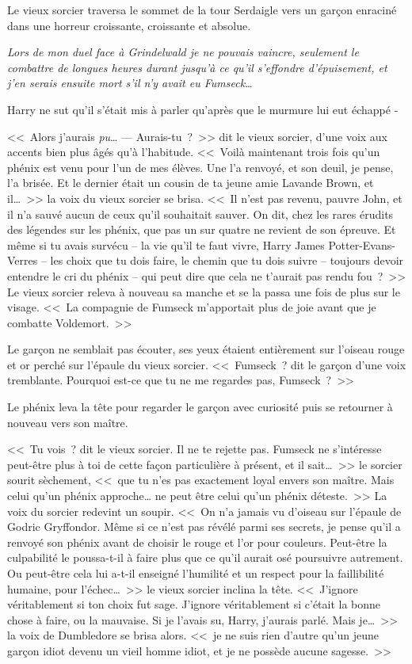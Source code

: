 Le vieux sorcier traversa le sommet de la tour Serdaigle vers un garçon enraciné dans une horreur croissante, croissante et absolue.

\emph{Lors de mon duel face à Grindelwald je ne pouvais vaincre, seulement le combattre de longues heures durant jusqu'à ce qu'il s'effondre d'épuisement, et j'en serais ensuite mort s'il n'y avait eu Fumseck…}

Harry ne sut qu'il s'était mis à parler qu'après que le murmure lui eut échappé -

<<~Alors j'aurais \emph{pu}…
---  Aurais-tu~?~>> dit le vieux sorcier, d'une voix aux accents bien plus âgés qu'à l'habitude. <<~Voilà maintenant trois fois qu'un phénix est venu pour l'un de mes élèves. Une l'a renvoyé, et son deuil, je pense, l'a brisée. Et le dernier était un cousin de ta jeune amie Lavande Brown, et il…~>> la voix du vieux sorcier se brisa. <<~Il n'est pas revenu, pauvre John, et il n'a sauvé aucun de ceux qu'il souhaitait sauver. On dit, chez les rares érudits des légendes sur les phénix, que pas un sur quatre ne revient de son épreuve. Et même si tu avais survécu -- la vie qu'il te faut vivre, Harry James Potter-Evans-Verres -- les choix que tu dois faire, le chemin que tu dois suivre -- toujours devoir entendre le cri du phénix -- qui peut dire que cela ne t'aurait pas rendu fou~?~>> Le vieux sorcier releva à nouveau sa manche et se la passa une fois de plus sur le visage. <<~La compagnie de Fumseck m'apportait plus de joie avant que je combatte Voldemort.~>>

Le garçon ne semblait pas écouter, ses yeux étaient entièrement sur l'oiseau rouge et or perché sur l'épaule du vieux sorcier. <<~Fumseck~? dit le garçon d'une voix tremblante. Pourquoi est-ce que tu ne me regardes pas, Fumseck~?~>>

Le phénix leva la tête pour regarder le garçon avec curiosité puis se retourner à nouveau vers son maître.

<<~Tu vois~? dit le vieux sorcier. Il ne te rejette pas. Fumseck ne s'intéresse peut-être plus à toi de cette façon particulière à présent, et il sait…~>> le sorcier sourit sèchement, <<~que tu n'es pas exactement loyal envers son maître. Mais celui qu'un phénix approche… ne peut être celui qu'un phénix déteste.~>> La voix du sorcier redevint un soupir. <<~On n'a jamais vu d'oiseau sur l'épaule de Godric Gryffondor. Même si ce n'est pas révélé parmi ses secrets, je pense qu'il a renvoyé son phénix avant de choisir le rouge et l'or pour couleurs. Peut-être la culpabilité le poussa-t-il à faire plus que ce qu'il aurait osé poursuivre autrement. Ou peut-être cela lui a-t-il enseigné l'humilité et un respect pour la faillibilité humaine, pour l'échec…~>> le vieux sorcier inclina la tête. <<~J'ignore véritablement si ton choix fut sage. J'ignore véritablement si c'était la bonne chose à faire, ou la mauvaise. Si je l'avais su, Harry, j'aurais parlé. Mais je…~>> la voix de Dumbledore se brisa alors. <<~je ne suis rien d'autre qu'un jeune garçon idiot devenu un vieil homme idiot, et je ne possède aucune sagesse.~>>

